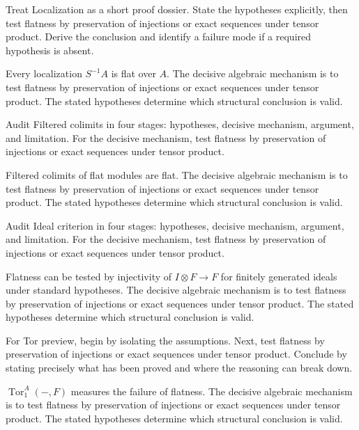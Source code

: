 \begin{problem}\label{prob:v14-problem-04}
Treat Localization as a short proof dossier. State the hypotheses explicitly, then test flatness by preservation of injections or exact sequences under tensor product. Derive the conclusion and identify a failure mode if a required hypothesis is absent.
\end{problem}
\begin{solution}
Every localization $S^{-1}A$ is flat over $A$. The decisive algebraic mechanism is to test flatness by preservation of injections or exact sequences under tensor product. The stated hypotheses determine which structural conclusion is valid.
\end{solution}

\begin{problem}\label{prob:v14-problem-05}
Audit Filtered colimits in four stages: hypotheses, decisive mechanism, argument, and limitation. For the decisive mechanism, test flatness by preservation of injections or exact sequences under tensor product.
\end{problem}
\begin{solution}
Filtered colimits of flat modules are flat. The decisive algebraic mechanism is to test flatness by preservation of injections or exact sequences under tensor product. The stated hypotheses determine which structural conclusion is valid.
\end{solution}

\begin{problem}\label{prob:v14-problem-06}
Audit Ideal criterion in four stages: hypotheses, decisive mechanism, argument, and limitation. For the decisive mechanism, test flatness by preservation of injections or exact sequences under tensor product.
\end{problem}
\begin{solution}
Flatness can be tested by injectivity of $I\otimes F\to F$ for finitely generated ideals under standard hypotheses. The decisive algebraic mechanism is to test flatness by preservation of injections or exact sequences under tensor product. The stated hypotheses determine which structural conclusion is valid.
\end{solution}

\begin{problem}\label{prob:v14-problem-07}
For Tor preview, begin by isolating the assumptions. Next, test flatness by preservation of injections or exact sequences under tensor product. Conclude by stating precisely what has been proved and where the reasoning can break down.
\end{problem}
\begin{solution}
$\operatorname{Tor}_1^A(-,F)$ measures the failure of flatness. The decisive algebraic mechanism is to test flatness by preservation of injections or exact sequences under tensor product. The stated hypotheses determine which structural conclusion is valid.
\end{solution}

